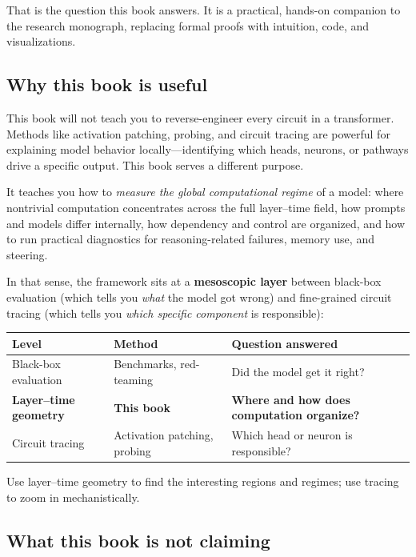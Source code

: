 \documentclass[11pt, twoside, openright]{memoir}
\begin{document}
That is the question this book answers. It is a practical, hands-on companion
to the research monograph, replacing formal proofs with intuition, code, and
visualizations.

\subsection*{Why this book is useful}

This book will not teach you to reverse-engineer every circuit in a
transformer. Methods like activation patching, probing, and circuit tracing
are powerful for explaining model behavior locally---identifying which heads,
neurons, or pathways drive a specific output. This book serves a different
purpose.

It teaches you how to \emph{measure the global computational regime} of a
model: where nontrivial computation concentrates across the full layer--time
field, how prompts and models differ internally, how dependency and control
are organized, and how to run practical diagnostics for reasoning-related
failures, memory use, and steering.

In that sense, the framework sits at a \textbf{mesoscopic layer} between
black-box evaluation (which tells you \emph{what} the model got wrong) and
fine-grained circuit tracing (which tells you \emph{which specific component}
is responsible):

\begin{center}
\small
\begin{tabular}{@{}l l l@{}}
\toprule
\textbf{Level} & \textbf{Method} & \textbf{Question answered} \\
\midrule
Black-box evaluation & Benchmarks, red-teaming &
  Did the model get it right? \\
\textbf{Layer--time geometry} & \textbf{This book} &
  \textbf{Where and how does computation organize?} \\
Circuit tracing & Activation patching, probing &
  Which head or neuron is responsible? \\
\bottomrule
\end{tabular}
\end{center}

Use layer--time geometry to find the interesting regions and regimes; use
tracing to zoom in mechanistically.

\subsection*{What this book is not claiming}
\end{document}
